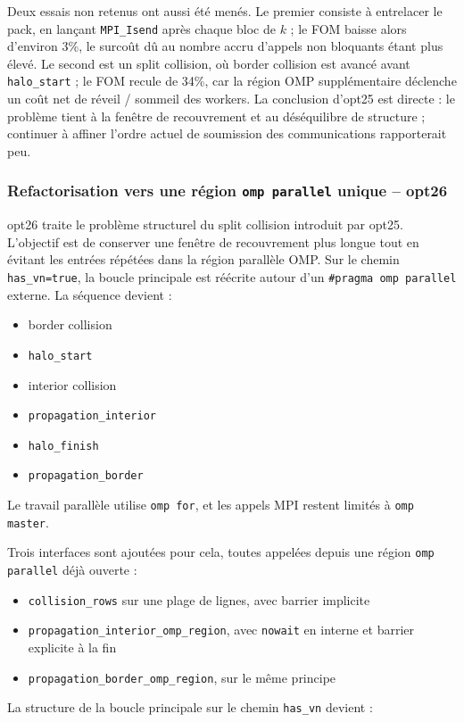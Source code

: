 \documentclass[a4paper,11pt,oneside]{report}
\newcommand{\code}[1]{\texttt{#1}}
\begin{document}
Deux essais non retenus ont aussi été menés. Le premier consiste à entrelacer le pack, en lançant
\code{MPI\_Isend} après chaque bloc de $k$ ; le FOM baisse alors d'environ 3\%, le surcoût dû au nombre accru d'appels non bloquants étant plus élevé.
Le second est un split collision, où border collision est avancé avant \code{halo\_start} ;
le FOM recule de 34\%, car la région OMP supplémentaire déclenche un coût net de réveil / sommeil des workers.
La conclusion d'opt25 est directe : le problème tient à la fenêtre de recouvrement et au déséquilibre de structure ; continuer à affiner l'ordre actuel de soumission des communications rapporterait peu.

\subsubsection{Refactorisation vers une région \texttt{omp parallel} unique -- opt26}

opt26 traite le problème structurel du split collision introduit par opt25. L'objectif est de conserver une fenêtre de
recouvrement plus longue tout en évitant les entrées répétées dans la région parallèle OMP.
Sur le chemin \code{has\_vn=true}, la boucle principale est réécrite autour d'un \code{\#pragma omp parallel} externe.
La séquence devient :
\begin{itemize}
\item border collision
\item \code{halo\_start}
\item interior collision
\item \code{propagation\_interior}
\item \code{halo\_finish}
\item \code{propagation\_border}
\end{itemize}
Le travail parallèle utilise \code{omp for}, et les appels MPI restent limités à \code{omp master}.

Trois interfaces sont ajoutées pour cela, toutes appelées depuis une région \code{omp parallel} déjà ouverte :
\begin{itemize}
\item \code{collision\_rows} sur une plage de lignes, avec barrier implicite
\item \code{propagation\_interior\_omp\_region}, avec \code{nowait} en interne et barrier explicite à la fin
\item \code{propagation\_border\_omp\_region}, sur le même principe
\end{itemize}
La structure de la boucle principale sur le chemin \code{has\_vn} devient :
\end{document}
